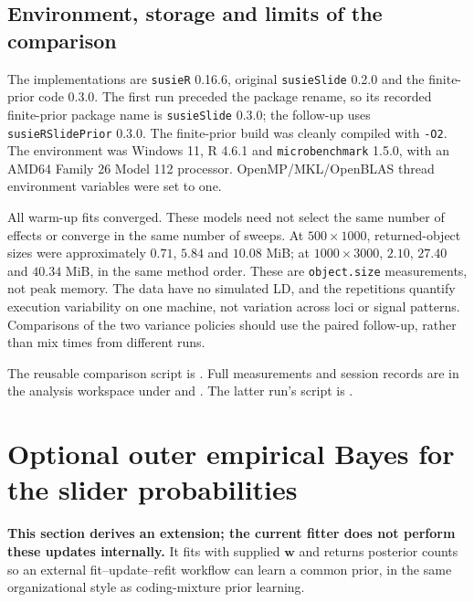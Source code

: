 \documentclass[11pt]{article}
\newcommand{\pkg}{\texttt{susieRSlidePrior}}
\begin{document}
\subsection{Environment, storage and limits of the comparison}
The implementations are \texttt{susieR} 0.16.6, original
\texttt{susieSlide} 0.2.0 and the finite-prior code 0.3.0.
The first run preceded the package rename, so its recorded finite-prior
package name is \texttt{susieSlide} 0.3.0; the follow-up uses
\pkg{} 0.3.0. The finite-prior build was cleanly compiled with
\texttt{-O2}. The environment was Windows 11, R 4.6.1 and
\texttt{microbenchmark} 1.5.0, with an AMD64 Family 26 Model 112 processor.
OpenMP/MKL/OpenBLAS thread environment variables were set to one.

All warm-up fits converged. These models need not select the same number
of effects or converge in the same number of sweeps. At $500\times1000$,
returned-object sizes were approximately $0.71$, $5.84$ and $10.08$ MiB;
at $1000\times3000$, $2.10$, $27.40$ and $40.34$ MiB, in the same method
order. These are \texttt{object.size} measurements, not peak memory.
The data have no simulated LD, and the repetitions quantify execution
variability on one machine, not variation across loci or signal patterns.
Comparisons of the two variance policies should use the paired
follow-up, rather than mix times from different runs.

The reusable comparison script is
. Full measurements and
session records are in the analysis workspace under
 and
.
The latter run's script is .

\section{Optional outer empirical Bayes for the slider probabilities}
\label{sec:outer}
\textbf{This section derives an extension; the current fitter does not
perform these updates internally.} It fits with supplied $\mathbf w$ and
returns posterior counts so an external fit--update--refit workflow can
learn a common prior, in the same organizational style as coding-mixture
prior learning.
\end{document}
